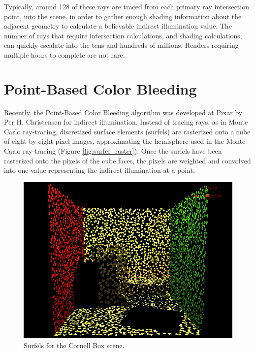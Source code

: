 Typically, around 128 of these rays are traced from each primary ray intersection point, into the scene, in order to gather enough shading information about the adjacent geometry to calculate a believable indirect illumination value. The number of rays that require intersection calculations, and shading calculations, can quickly escalate into the tens and hundreds of millions. Renders requiring multiple hours to complete are not rare.

\section{Point-Based Color Bleeding}
\label{sec:PBCB}
Recently, the Point-Based Color Bleeding algorithm was developed at Pixar by Per H. Christensen \cite{bib:christensen2008} for indirect illumination. Instead of tracing rays, as in Monte Carlo ray-tracing, discretized surface elements (surfels) are rasterized onto a cube of eight-by-eight-pixel images, approximating the hemisphere used in the Monte Carlo ray-tracing (Figure \ref{fig:surfel_raster}). Once the surfels have been rasterized onto the pixels of the cube faces, the pixels are weighted and convolved into one value representing the indirect illumination at a point.

\begin{figure}[p]
   \centering
   \includegraphics[width=130mm]{../img/surfel_cloud_tris.png}
   \captionfonts
   \caption{Surfels for the Cornell Box scene.}
   \label{fig:surfels}
\end{figure}

